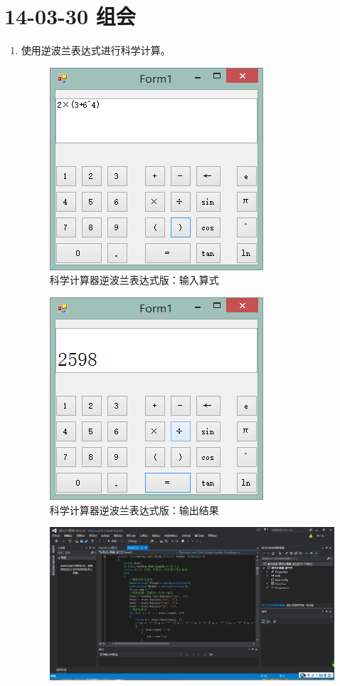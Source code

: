 \documentclass[]{report}
\begin{document}
\section{14-03-30 组会}
\begin{enumerate}
	\item 使用逆波兰表达式进行科学计算。
\begin{figure}
\centering
\includegraphics[width=0.7\linewidth]{./PIC/CalcP0}
\caption{科学计算器逆波兰表达式版：输入算式}
\label{fig:CalcP0}
\end{figure}
\begin{figure}
\centering
\includegraphics[width=0.7\linewidth]{./PIC/CalcP1}
\caption{科学计算器逆波兰表达式版：输出结果}
\label{fig:CalcP1}
\end{figure}
\begin{figure}
\centering
\includegraphics[width=1\linewidth]{./PIC/CalcP2}

\end{figure}
\end{enumerate}
\end{document}
